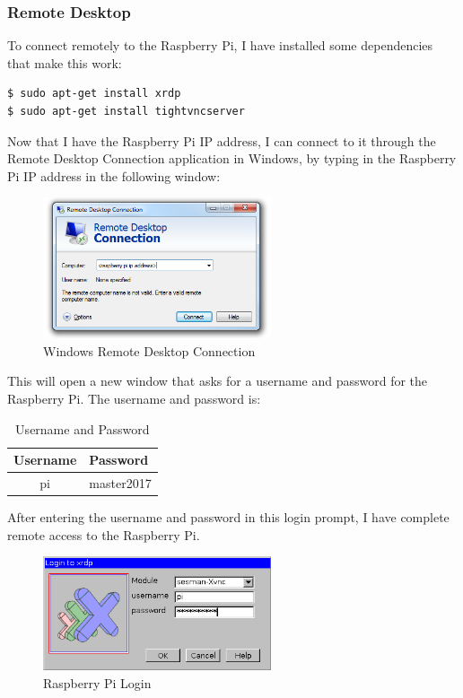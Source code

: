 \subsubsection{Remote Desktop}
To connect remotely to the Raspberry Pi, I have installed some dependencies that make this work:
\begin{verbatim}
$ sudo apt-get install xrdp
$ sudo apt-get install tightvncserver
\end{verbatim}
Now that I have the Raspberry Pi IP address, I can connect to it through the Remote Desktop Connection application in Windows, by typing in the Raspberry Pi IP address in the following window:
\begin{figure}[H]
  \centering
  \includegraphics[width=0.6\textwidth]{fig/remote1}
  \caption{Windows Remote Desktop Connection}
  \label{fig:remote1}
\end{figure}
This will open a new window that asks for a username and password for the Raspberry Pi. The username and password is:
\begin{table}[H]
\centering

\begin{tabular}{|l|l|}
\hline
\textbf{Username}        & \textbf{Password}               \\ \hline
\multicolumn{1}{|c|}{pi} & \multicolumn{1}{c|}{master2017} \\ \hline
\end{tabular}
\caption{Username and Password}
\label{password}
\end{table}
After entering the username and password in this login prompt, I have complete remote access to the Raspberry Pi.
\begin{figure}[H]
  \centering
  \includegraphics[width=0.6\textwidth]{fig/remote2}
  \caption{Raspberry Pi Login}
  \label{fig:ping}
\end{figure}










